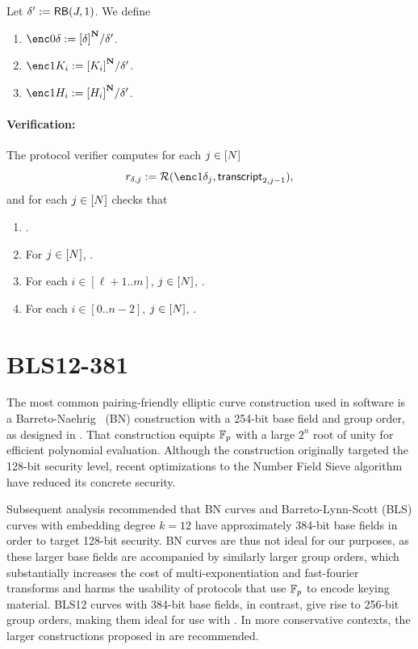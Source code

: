 \documentclass{article}
\begin{document}
\noindent
Let $\delta' := \mathsf{\mathsf {RB}}(J,1)$.
We define
\begin{enumerate}
\item $\enc0{\delta} \defeq \acc{\delta}{\numplayers}/\delta'$.
\item $\enc1{K_i}\defeq\acc{K_i}{\numplayers}/\delta'$.

\item $\enc1{H_i}\defeq \acc{H_i}{\numplayers}/\delta'$.

\end{enumerate}

\paragraph{Verification:}
The protocol verifier computes for each $j\in [N]$
\[ r_{\delta,j}\defeq \RO(\enc1{\delta_j},\transcript_{2,j-1}),\]
and for each $j\in [N]$ checks that
\begin{enumerate}
  \item {}.
  \item For $j\in [N]$, .
 \item For each $i\in [\ell+1..m]$, $j\in [N]$, .
 \item For each $i\in [0..n-2]$, $j\in [N]$, .
\end{enumerate}

\section{BLS12-381}

The most common pairing-friendly elliptic curve construction used in {\snark} software is a Barreto-Naehrig~\cite{BN} (BN) construction with a 254-bit base field and group order, as designed in \cite{cryptoeprint:2013:507}. That construction equipts ${\mathbb F}_p$ with a large $2^n$ root of unity for efficient polynomial evaluation. Although the construction originally targeted the 128-bit security level, recent optimizations to the Number Field Sieve algorithm \cite{NFSOptimization} have reduced its concrete security.

Subsequent analysis \cite{cryptoeprint:2016:1102} recommended that BN curves and Barreto-Lynn-Scott (BLS) curves \cite{cryptoeprint:2002:088} with embedding degree $k = 12$ have approximately 384-bit base fields in order to target 128-bit security. BN curves are thus not ideal for our purposes, as these larger base fields are accompanied by similarly larger group orders, which substantially increases the cost of multi-exponentiation and fast-fourier transforms and harms the usability of protocols that use ${\mathbb F}_p$ to encode keying material. BLS12 curves with 384-bit base fields, in contrast, give rise to 256-bit group orders, making them ideal for use with {\snarks}. In more conservative contexts, the larger constructions proposed in \cite{cryptoeprint:2017:334} are recommended.
\end{document}
